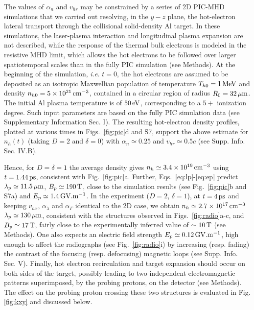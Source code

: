 \documentclass[aps,twocolumn,showpacs,superscriptaddress]{revtex4}
\begin{document}
The values of  $\alpha_n$ and $v_{hr}$ may be constrained by a  series of 2D PIC-MHD simulations  that we carried out resolving, in  the $y-z$ plane, the hot-electron lateral transport through the collisional solid-density Al target. In these simulations, the laser-plasma interaction and longitudinal plasma expansion are not described, while the response of the thermal bulk electrons is modeled in the resistive MHD limit, which allows the hot electrons to be followed over larger spatiotemporal scales than in the fully PIC simulation (see Methods). 
At the beginning of the simulation, \emph{i.e.} $t = 0$, the hot electrons are assumed to be deposited  as an isotropic Maxwellian population of temperature $T_{h0}=1\,\rm MeV$ and density $n_{h0}=5\times10^{21}\,\rm cm^{-3}$, contained in a circular region of radius $R_{0}=32\,\rm \mu m$. 
The initial Al plasma temperature is of $50\,\rm eV$, corresponding to a $5+$ ionization degree. Such input parameters are based on the fully PIC simulation data (see Supplementary Information Sec. I). 
The resulting hot-electron density profiles, plotted at various times in Figs.~\ref{fig:pic}d and S7, support the above estimate for $n_h(t)$ (taking $D=2$ and $\delta=0$) with $\alpha_n \simeq 0.25$ and $v_{hr}\simeq 0.5c$ (see  Supp. Info. Sec. IV.B).

Hence, for  $D=\delta=1$ the average density gives $n_h \simeq 3.4 \times 10^{19}\,\rm cm^{-3}$ using $t = 1.44\,\rm ps$, consistent with Fig.~\ref{fig:pic}a. Further, Eqs.~\eqref{eq:lp}-\eqref{eq:ep} predict $\lambda_p \simeq 11.5 \,\rm \mu m$, $B_p \simeq 190\,\rm T$, close to the simulation results (see Fig.~\ref{fig:pic}b and S7a) and $E_p \simeq 1.4\,\rm GV.m^{-1}$. 
In the experiment ($D=2$, $\delta=1$), at $t=4\,\rm ps$ and keeping $v_{hx}$, $\alpha_\lambda$ and $\alpha_\Gamma$ identical to the 2D case,  we obtain $n_h \simeq 2.7 \times 10^{17}\,\rm cm^{-3}$
$\lambda_p \simeq 130\,\rm \mu m$, consistent with the structures observed in Figs.~\ref{fig:radio}a-c, and $B_p\simeq 17\,\rm T$, fairly close to the  experimentally inferred value of $\sim 10\,\rm T$ (see Methods). One also expects an electric field strength $E_p \simeq 0.12 \,\rm GV.m^{-1}$, high enough to affect the radiographs (see Fig.~\ref{fig:radio}i) by increasing (resp. fading) the contrast of the focusing (resp. defocusing) magnetic loops (see Supp. Info. Sec. V). Finally,  hot electron recirculation and target expansion should occur on both sides of the target, possibly leading to two independent electromagnetic patterns superimposed, by the probing protons, on the detector (see Methods). The effect on the probing proton crossing these two structures is  evaluated in Fig. \ref{fig:kxy} and discussed below.
\end{document}

